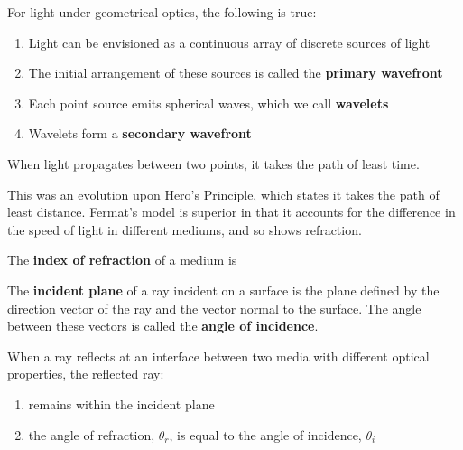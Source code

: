 \begin{proposition}
    For light under geometrical optics, the following is true:
    \begin{enumerate}
        \item Light can be envisioned as a continuous array of discrete sources of light
        \item The initial arrangement of these sources is called the \textbf{primary wavefront}
        \item Each point source emits spherical waves, which we call \textbf{wavelets}
        \item Wavelets form a \textbf{secondary wavefront}
    \end{enumerate}
\end{proposition}

\begin{proposition}
    When light propagates between two points, it takes the path of least time.
    \begin{remark}
        This was an evolution upon Hero's Principle, which states it takes the path of least distance. Fermat's model is superior in that it accounts for the difference in the speed of light in different mediums, and so shows refraction.
    \end{remark}
\end{proposition}

\begin{definition}
    The \textbf{index of refraction} of a medium is %
\end{definition}


\begin{definition}
    The \textbf{incident plane} of a ray incident on a surface is the plane defined by the direction vector of the ray and the vector normal to the surface. The angle between these vectors is called the \textbf{angle of incidence}.
\end{definition}

\begin{theorem}
    When a ray reflects at an interface between two media with different optical properties, the reflected ray:
    \begin{enumerate}
        \item remains within the incident plane
        \item the angle of refraction, $\theta_r$, is equal to the angle of incidence, $\theta_i$
    \end{enumerate}
\end{theorem}

